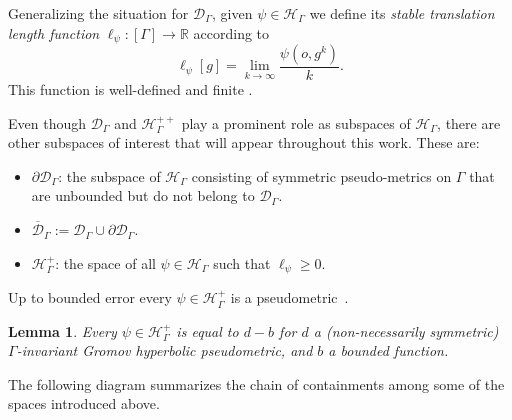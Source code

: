 \documentclass[twoside]{amsart}
\newtheorem{lemma}[theorem]{Lemma}
\theoremstyle{definition}
\numberwithin{equation}{section}
\numberwithin{theorem}{section}
\newcommand{\R}{\mathbb{R}}
\newcommand{\Bc}{{\mathcal B}}
\newcommand{\calD}{\mathcal{D}}
\newcommand{\calH}{\mathcal{H}}
\newcommand{\Hc}{{\mathcal H}}
\newcommand{\calQ}{\mathcal{Q}}
\newcommand{\G}{\Gamma}
\newcommand{\p}{\psi}
\newcommand{\bs}{\backslash}
\newcommand{\ra}{\rightarrow}
\newcommand{\ov}[1]{\overline{#1}}
\begin{document}
Generalizing the situation for $\calD_\G$, given $\p\in \calH_\G$ we define its \emph{stable translation length function} $\ell_\p:[\G] \ra \R$ according to
\[\ell_{\p}[g]=\lim_{k\to \infty}{\frac{\p(o,g^k)}{k}}.\]
This function is well-defined and finite \cite[Lemma~3.4]{CRS}. 

Even though $\calD_\G$ and $\calH_\G^{++}$ play a prominent role as subspaces of $\calH_\G$, there are other subspaces of interest that will appear throughout this work. These are:
\begin{itemize}
    \item $\partial \calD_\G$: the subspace of $\calH_\G$ consisting of symmetric pseudo-metrics on $\G$ that are unbounded but do not belong to $\calD_\G$.  
    \item $\ov{\calD}_\G:=\calD_\G \cup \partial \calD_\G$.
     \item $\calH_\G^{+}$: the space of all $\p\in \calH_\G$ such that $\ell_\p\geq 0$.
\end{itemize}

Up to bounded error every $\p \in \Hc_\G^+$ is a pseudometric~\cite[Lemma~3.4]{CRS}.

\begin{lemma}\label{lem:potential_pseudometric} Every $\p \in \Hc_\G^+$ is equal to $d-b$ for $d$ a (non-necessarily symmetric) $\G$-invariant Gromov hyperbolic pseudometric, and $b$ a bounded function.
\end{lemma}

The following diagram summarizes the chain of containments among some of the spaces introduced above.
\end{document}
